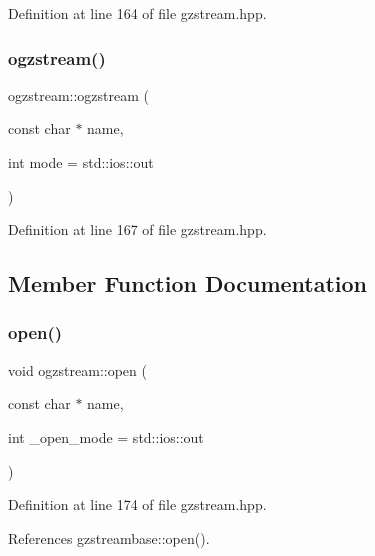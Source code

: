 Definition at line 164 of file gzstream.\+hpp.

\mbox{\label{classogzstream_af1c122fb77cbd03758c820f7499ebdd8}} 
\subsubsection{\texorpdfstring{ogzstream()}{ogzstream()}\hspace{0.1cm}{\footnotesize\ttfamily [2/2]}}
{\footnotesize\ttfamily ogzstream\+::ogzstream (\begin{DoxyParamCaption}\item[{const char $\ast$}]{name,  }\item[{int}]{mode = {\ttfamily std\+:\+:ios\+:\+:out} }\end{DoxyParamCaption})\hspace{0.3cm}{\ttfamily [inline]}}



Definition at line 167 of file gzstream.\+hpp.



\subsection{Member Function Documentation}
\mbox{\label{classogzstream_aff704df274dda46c84ef1e814e84b05e}} 
\subsubsection{\texorpdfstring{open()}{open()}}
{\footnotesize\ttfamily void ogzstream\+::open (\begin{DoxyParamCaption}\item[{const char $\ast$}]{name,  }\item[{int}]{\+\_\+open\+\_\+mode = {\ttfamily std\+:\+:ios\+:\+:out} }\end{DoxyParamCaption})\hspace{0.3cm}{\ttfamily [inline]}}



Definition at line 174 of file gzstream.\+hpp.



References gzstreambase\+::open().

